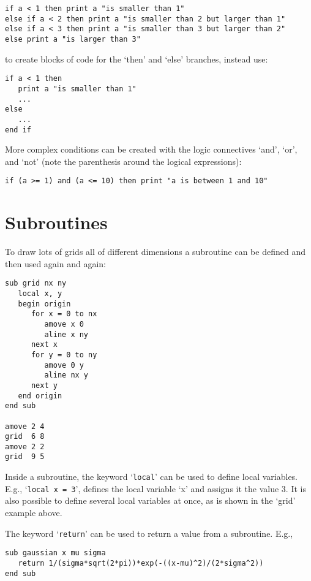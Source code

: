 \preglecode{}
\begin{Verbatim}
if a < 1 then print a "is smaller than 1"
else if a < 2 then print a "is smaller than 2 but larger than 1"
else if a < 3 then print a "is smaller than 3 but larger than 2"
else print a "is larger than 3"
\end{Verbatim}
\postglecode{}

\noindent{}to create blocks of code for the `then' and `else' branches, instead use:

\preglecode{}
\begin{Verbatim}
if a < 1 then
   print a "is smaller than 1"
   ...
else
   ...
end if
\end{Verbatim}
\postglecode{}

More complex conditions can be created with the logic connectives `{\sf and}', `{\sf or}', and `{\sf not}' (note the parenthesis around the logical expressions):

\preglecode{}
\begin{Verbatim}
if (a >= 1) and (a <= 10) then print "a is between 1 and 10"
\end{Verbatim}
\postglecode{}

\section{Subroutines}

To draw lots of grids all of different dimensions a subroutine can
be defined and then used again and again:

\preglecode{}
\begin{Verbatim}
sub grid nx ny 
   local x, y
   begin origin
      for x = 0 to nx
         amove x 0 
         aline x ny 
      next x
      for y = 0 to ny
         amove 0 y 
         aline nx y 
      next y 
   end origin
end sub
     
amove 2 4
grid  6 8
amove 2 2
grid  9 5
\end{Verbatim}
\postglecode{}

Inside a subroutine, the keyword `\texttt{local}' can be used to define local variables. E.g., `\texttt{local x = 3}', defines the local variable `x' and assigns it the value 3. It is also possible to define several local variables at once, as is shown in the `grid' example above.

The keyword `\texttt{return}' can be used to return a value from a subroutine. E.g.,

\preglecode{}
\begin{Verbatim}
sub gaussian x mu sigma
   return 1/(sigma*sqrt(2*pi))*exp(-((x-mu)^2)/(2*sigma^2))
end sub
\end{Verbatim}
\postglecode{}

